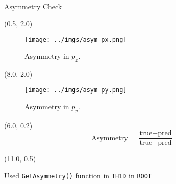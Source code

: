\documentclass[12pt, xcolor={dvipsnames}, aspectratio = 169]{beamer}
\begin{document}
\begin{frame}[fragile]{Asymmetry Check}

\begin{textblock}{7.0}(0.5, 2.0)
    \begin{figure}
        \centering
        \texttt{[image: ../imgs/asym-px.png]}
        \caption{Asymmetry in $p_{x}$.}
    \end{figure}
\end{textblock}

\begin{textblock}{7.0}(8.0, 2.0)
    \begin{figure}
        \centering
        \texttt{[image: ../imgs/asym-py.png]}
        \caption{Asymmetry in $p_{y}$.}
    \end{figure}
\end{textblock}

\begin{textblock}{5.0}(6.0, 0.2)
\color{blue}
\begin{equation*}
\text{Asymmetry} = \frac{\text{true} - \text{pred}}{\text{true} + \text{pred}}
\end{equation*}
\end{textblock}

\begin{textblock}{5.0}(11.0, 0.5)
\color{blue}
\begin{tiny}
Used \verb|GetAsymmetry()| function in \verb|TH1D| in \verb|ROOT|
\end{tiny}
\end{textblock}

\end{frame}
\end{document}

